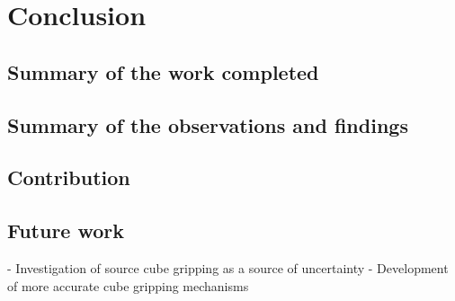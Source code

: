 
\section{Conclusion}

\subsection{Summary of the work completed}

\subsection{Summary of the observations and findings}

\subsection{Contribution}

\subsection{Future work}

- Investigation of source cube gripping as a source of uncertainty
- Development of more accurate cube gripping mechanisms

\newpage




